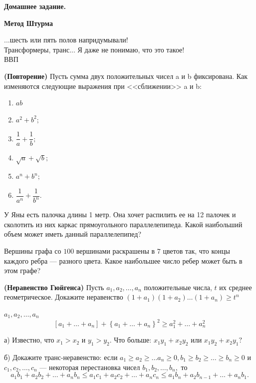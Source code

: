 \centerline{\bf \Huge Домашнее задание.}
\centerline{\bf \Huge Метод Штурма}

\begin{flushright}
        \scriptsize{...шесть или пять полов напридумывали! \\Трансформеры, транс... Я даже не понимаю, что это такое!\\ВВП}
\end{flushright}

\textbf{(Повторение)}
Пусть сумма двух положительных чисел a и b фиксирована. Как изменяются следующие выражения при <<сближении>> a и b:

\begin{enumerate}
    \item  $ab$
    \item  $a^2 + b^2;$
    \item  $\dfrac{1}{a} + \dfrac{1}{b};$
    \item  $\sqrt{a} + \sqrt{b};$
    \item  $a^n + b^n;$
    \item  $\dfrac{1}{a^n} + \dfrac{1}{b^n}.$
\end{enumerate}

У Яны есть палочка длины 1 метр. Она хочет распилить ее на 12 палочек и сколотить из них каркас прямоугольного параллелепипеда. Какой наибольший объем может иметь данный параллелепипед?

Вершины графа со $100$ вершинами раскрашены в $7$ цветов так, что концы каждого ребра --- разного цвета. Какое наибольшее число ребер может быть в этом графе?

\textbf{(Неравенство Гюйгенса)} Пусть $a_1, a_2, \ldots,a_n$ положительные числа, $t$ их среднее геометрическое. Докажите неравенство $(1+a_1)(1+a_2)\ldots(1+a_n) \geq t^n$

 $a_1, a_2, \ldots, a_n$  \[\left[a_1+\ldots+a_n\right]+\left\{a_1+\ldots+a_n\right\}^2 \geq a_1^2+\ldots+a_n^2\]

а) Известно, что $x_1>x_2$ и $y_1>y_2.$ Что больше: $x_1y_1+x_2y_2$ или $x_1y_2+x_2y_1?$

б) Докажите транс-неравенство: если $a_1 \geq a_2 \geq \ldots a_n \geq 0, b_1 \geq b_2 \geq \ldots \geq b_n \geq 0$ и $c_1, c_2, \ldots, c_n$ --- некоторая перестановка чисел $b_1, b_2, \ldots, b_n,$ то
\[a_1b_1+a_2b_2+ \ldots +a_nb_n \leq a_1c_1 + a_2c_2 + \ldots + a_nc_n \leq a_1b_n + a_2b_{n-1} + \ldots + a_nb_1.\]